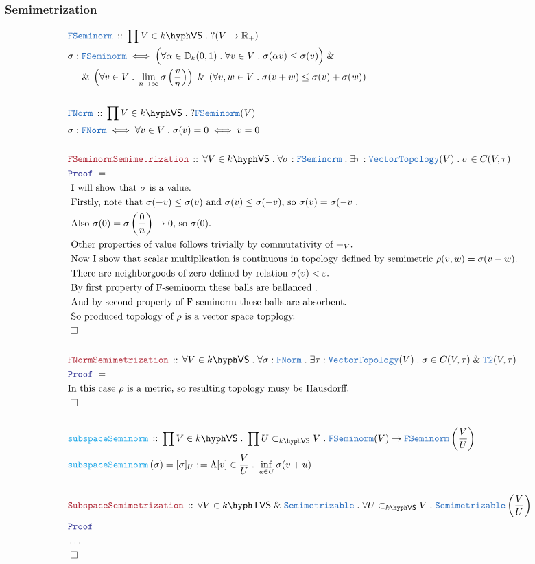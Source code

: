 \documentclass[12pt]{scrartcl}
\newcommand{\TYPE}[1]{\textcolor{NavyBlue}{\mathtt{#1}}}
\newcommand{\FUNC}[1]{\textcolor{Cerulean}{\mathtt{#1}}}
\newcommand{\LOGIC}[1]{\textcolor{Blue}{\mathtt{#1}}}
\newcommand{\THM}[1]{\textcolor{Maroon}{\mathtt{#1}}}
\renewcommand{\.}{\; . \;}
\newcommand{\de}{: \kern 0.1pc =}
\newcommand{\Act}[1]{\left( #1 \right)}
\newcommand{\Theorem}[2]{& \THM{#1} \, :: \, #2 \\ & \Proof = \\ }
\newcommand{\DeclareType}[2]{& \TYPE{#1} \, :: \, #2 \\}
\newcommand{\DefineType}[3]{& #1 : \TYPE{#2} \iff #3 \\}
\newcommand{\DeclareFunc}[2]{& \FUNC{#1} \, :: \, #2 \\}
\newcommand{\DefineNamedFunc}[4]{&  \FUNC{#1}\Act{#2} = #3 \de #4 \\}
\newcommand{\NewLine}{\\ & \kern 1pc}
\newcommand{\Page}[1]{ \begin{align*} #1 \end{align*}   }
\newcommand{\NoProof}{ & \ldots \\ \EndProof}
\newcommand{\Explain}[1]{& \text{#1.} \\}
\renewcommand{\And}{\; \& \;}
\newcommand{\Reals}{\mathbb{R} }
\newcommand{\QED}{\; \square}
\newcommand{\EndProof}{& \QED \\}
\newcommand{\Proof}{\LOGIC{Proof} \; }
\newcommand{\Top}{\TYPE{Topology}}
\newcommand{\Disc}{\mathbb{D}}
\newcommand{\VS}[1]{#1\hyph\mathsf{VS}} %
\newcommand{\Vect}{\TYPE{Vector}}
\newcommand{\TVS}[1]{{#1}\hyph\mathsf{TVS}}
\begin{document}
\subsubsection{Semimetrization}
\Page{
	\DeclareType{FSeminorm}
	{
		\prod V \in \VS{k} \. ?(V \to \Reals_+)
	}
	\DefineType{\sigma}{FSeminorm}
	{
		\Big(
			\forall \alpha \in \Disc_k(0,1) \. 
			\forall v \in V \.
			\sigma(\alpha v) \le \sigma(v)
		\Big)
		\And  \NewLine \And
		\left(
			\forall v \in V \.
			\lim_{n \to \infty} \sigma\left(\frac{v}{n}\right)
		\right)
		\And 
		\left(
			\forall v,w \in V \.
			\sigma(v + w) \le \sigma(v) + \sigma(w)
		\right)
	}
	\\
	\DeclareType{FNorm}
	{
			\prod V \in \VS{k} \. ?\TYPE{FSeminorm}(V)
	}
	\DefineType{\sigma}{FNorm}
	{
		\forall v \in V \. \sigma(v) = 0 \iff v = 0
	}
	\\
	\Theorem{FSeminormSemimetrization}
	{
		\forall V \in \VS{k} \.
		\forall \sigma : \TYPE{FSeminorm} \.
		\exists \tau : \Vect\Top(V) \.
		\sigma \in C(V,\tau)
	}
	\Explain{ I will show that $\sigma$ is a value}
	\Explain{
		Firstly, note that 
		$\sigma(-v)\le \sigma(v)$
		and
		$\sigma(v) \le \sigma(-v)$, so
		$\sigma(v) = \sigma(-v$
	}
	\Explain{
		Also $\sigma(0) = \sigma\left( \frac{0}{n} \right) \to 0$,
		so $\sigma(0)$}
	\Explain{
		Other properties of value follows trivially by commutativity of $+_V$}
	\Explain{
		Now I show that scalar multiplication is continuous
		in topology defined by semimetric $\rho(v,w) = \sigma(v-w)$}
	\Explain{
		There are neighborgoods of zero defined by relation $\sigma(v) < \varepsilon$}
	\Explain{
		By first property of F-seminorm these balls are ballanced
	}
	\Explain{
		And by second property of F-seminorm these balls are absorbent}
	\Explain{
		So produced topology of $\rho$ is a vector space topplogy}
	\EndProof
	\\
	\Theorem{FNormSemimetrization}
	{
		\forall V \in \VS{k} \.
		\forall \sigma : \TYPE{FNorm} \.
		\exists \tau : \Vect\Top(V) \.
		\sigma \in C(V,\tau) \And \TYPE{T2}(V,\tau)
	}
	\Explain{In this case $\rho$ is a metric, so resulting topology musy be Hausdorff}
	\EndProof
	\\
	\DeclareFunc{subspaceSeminorm}
	{
		\prod V  \in \VS{k} \.
		\prod U \subset_{\VS{k}}  V \.
		\TYPE{FSeminorm}(V) \to \TYPE{FSeminorm}\left(\frac{V}{U}\right)
	}
	\DefineNamedFunc{subspaceSeminorm}{\sigma}{[\sigma]_U}
	{
		\Lambda [v] \in \frac{V}{U} \.  \inf_{u \in U} \sigma(v + u)	
	}
	\\
	\Theorem{SubspaceSemimetrization}{
		\forall  V \in \TVS{k} \And \TYPE{Semimetrizable} \.
		\forall U \subset_{\VS{k}} V \.
		 \TYPE{Semimetrizable}\left( \frac{V}{U} \right)
	}
	\NoProof
}
\newpage
\end{document}
